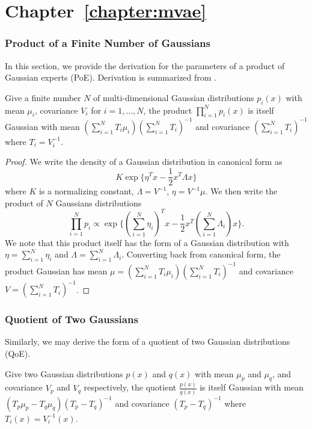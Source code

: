 \section{Chapter~\ref{chapter:mvae}}
\label{sec:proof:mvae}

\subsubsection{Product of a Finite Number of Gaussians}
In this section, we provide the derivation for the parameters of a product of Gaussian experts (PoE). Derivation is summarized from \cite{bromiley2003products}.

\begin{lem}
Give a finite number $N$ of multi-dimensional Gaussian distributions $p_{i}(x)$ with mean $\mu_{i}$, covariance $V_{i}$ for $i = 1, ..., N$, the product $\prod_{i=1}^{N} p_{i}(x)$ is itself Gaussian with mean $(\sum_{i=1}^{N} T_{i}\mu_{i})(\sum_{i=1}^{N} T_{i})^{-1}$ and covariance $(\sum_{i=1}^{N} T_{i})^{-1}$ where $T_i = V_{i}^{-1}$.
\end{lem}

\begin{proof} We write the density of a Gaussian distribution in canonical form as \[K\exp\{\eta^{T}x - \frac{1}{2}x^{T}\Lambda x\}\] where $K$ is a normalizing constant, $\Lambda = V^{-1}$, $\eta = V^{-1}\mu$. We then write the product of $N$ Gaussians distributions \[\prod_{i=1}^{N} p_i \propto \exp\{(\sum_{i=1}^{N} \eta_i)^{T}x - \frac{1}{2}x^{T}(\sum_{i=1}^{N} \Lambda_{i})x\}.\] We note that this product itself has the form of a Gaussian distribution with $\eta = \sum_{i=1}^{N} \eta_i$ and $\Lambda = \sum_{i=1}^{N}\Lambda_i$. Converting back from canonical form, the product Gaussian has mean $\mu = (\sum_{i=1}^{N} T_{i}\mu_{i})(\sum_{i=1}^{N} T_{i})^{-1}$ and covariance $V = (\sum_{i=1}^{N} T_{i})^{-1}$.
\end{proof}

\subsubsection{Quotient of Two Gaussians}
Similarly, we may derive the form of a quotient of two Gaussian distributions (QoE).

\begin{lem}
Give two Gaussian distributions $p(x)$ and $q(x)$ with mean $\mu_{p}$ and $\mu_{q}$, and covariance $V_{p}$ and $V_{q}$ respectively, the quotient $\frac{p(x)}{q(x)}$ is itself Gaussian with mean $(T_{p}\mu_{p} - T_{q}\mu_{q})(T_{p} - T_{q})^{-1}$ and covariance $(T_{p} - T_{q})^{-1}$ where $T_i(x) = V_{i}^{-1}(x)$.
\end{lem}

